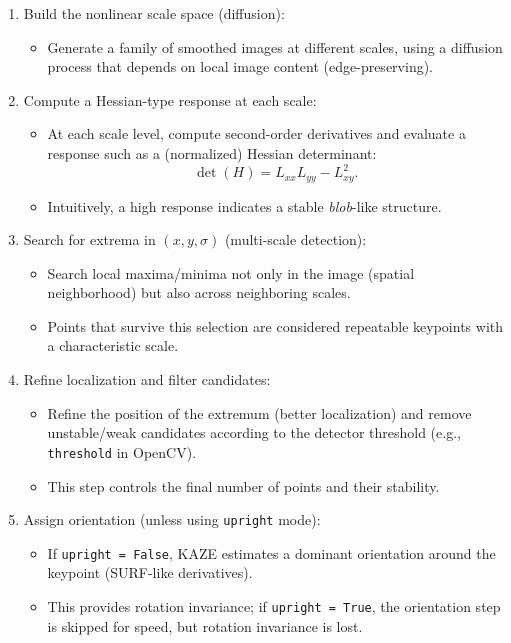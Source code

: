 \begin{enumerate}
    \item Build the nonlinear scale space (diffusion):
    \begin{itemize}
        \item Generate a family of smoothed images at different scales, using a diffusion process that depends on local image content (edge-preserving).
    \end{itemize}

    \item Compute a Hessian-type response at each scale:
    \begin{itemize}
        \item At each scale level, compute second-order derivatives and evaluate a response such as a (normalized) Hessian determinant:
        $$
        \det(H) = L_{xx}L_{yy} - L_{xy}^2.
        $$
        \item Intuitively, a high response indicates a stable \emph{blob}-like structure.
    \end{itemize}

    \item Search for extrema in $(x,y,\sigma)$ (multi-scale detection):
    \begin{itemize}
        \item Search local maxima/minima not only in the image (spatial neighborhood) but also across neighboring scales.
        \item Points that survive this selection are considered repeatable keypoints with a characteristic scale.
    \end{itemize}

    \item Refine localization and filter candidates:
    \begin{itemize}
        \item Refine the position of the extremum (better localization) and remove unstable/weak candidates according to the detector threshold (e.g., \texttt{threshold} in OpenCV).
        \item This step controls the final number of points and their stability.
    \end{itemize}

    \item Assign orientation (unless using \texttt{upright} mode):
    \begin{itemize}
        \item If \texttt{upright = False}, KAZE estimates a dominant orientation around the keypoint (SURF-like derivatives).
        \item This provides rotation invariance; if \texttt{upright = True}, the orientation step is skipped for speed, but rotation invariance is lost.
    \end{itemize}


\end{enumerate}
